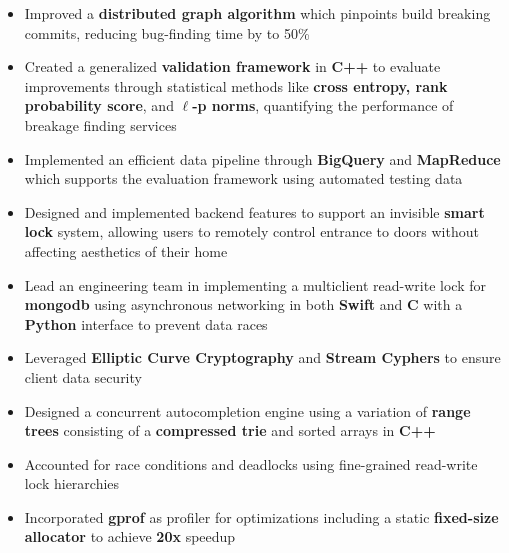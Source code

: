 \documentclass[10pt,a4paper,ragged2e]{altacv}
\begin{document}
\begin{itemize}
    \item Improved a \textbf{distributed graph algorithm} which pinpoints build breaking commits,
      reducing bug-finding time by to 50\%
    \item Created a generalized \textbf{validation framework} in \textbf{C++} to evaluate improvements
      through statistical methods like \textbf{cross entropy, rank probability score}, and \textbf{$\ell$-p norms},
      quantifying the performance of breakage finding services
    \item Implemented an efficient data pipeline through \textbf{BigQuery} and \textbf{MapReduce}
      which supports the evaluation framework using automated testing data
\end{itemize}

\divider

\begin{itemize}
    \item Designed and implemented backend features to support an invisible \textbf{smart lock} system,
        allowing users to remotely control entrance to doors without affecting aesthetics of their home
    \item Lead an engineering team in implementing a multiclient read-write lock for \textbf{mongodb} using asynchronous networking in both \textbf{Swift} and \textbf{C} with a \textbf{Python} interface to prevent data races
    \item Leveraged \textbf{Elliptic Curve Cryptography} and \textbf{Stream Cyphers} to ensure client data security
\end{itemize}

\iffalse
{}
\begin{itemize}
    \item Designed a concurrent autocompletion engine using a variation of \textbf{range trees} consisting of a \textbf{compressed trie} and sorted arrays in \textbf{C++}
    \item Accounted for race conditions and deadlocks using fine-grained read-write lock hierarchies
    \item Incorporated \textbf{gprof} as profiler for optimizations including a static \textbf{fixed-size allocator} to achieve \textbf{20x} speedup
\end{itemize}
\end{document}
